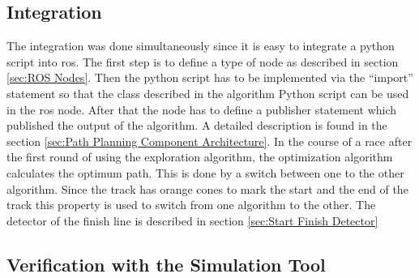 \subsection{Integration} \label{sec:Integration}
The integration was done simultaneously since it is easy to integrate a python script into \acrshort{ros}. The first step is to define a type of node as described in section \ref{sec:ROS Nodes}. Then the python script has to be implemented via the ``import'' statement so that the class described in the algorithm Python script can be used in the \acrshort{ros} node. After that the node has to define a publisher statement which published the output of the algorithm. A detailed description is found in the section \ref{sec:Path Planning Component Architecture}.
In the course of a race after the first round of using the exploration algorithm, the optimization algorithm calculates the optimum path. This is done by a switch between one to the other algorithm. Since the track has orange cones to mark the start and the end of the track this property is used to switch from one algorithm to the other. The detector of the finish line is described in section \ref{sec:Start Finish Detector}

\subsection{Verification with the Simulation Tool} \label{sec:Verification with the Simulation Tool}


